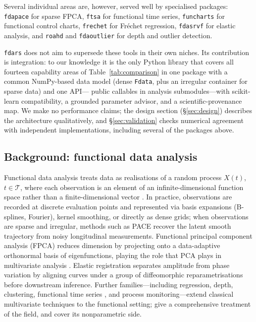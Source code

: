 Several individual areas are, however, served well by specialised packages:
\texttt{fdapace} \citep{r_fdapace} for sparse FPCA, \texttt{ftsa}
\citep{r_ftsa} for functional time series, \texttt{funcharts}
\citep{capezza_funcharts_2023} for functional control charts,
\texttt{frechet} \citep{r_frechet} for Fr\'{e}chet regression,
\texttt{fdasrvf} \citep{r_fdasrvf} for elastic analysis, and \texttt{roahd}
and \texttt{fdaoutlier} \citep{r_roahd,r_fdaoutlier} for depth and outlier
detection.

\texttt{fdars} does not aim to supersede these tools in their own niches.
Its contribution is integration: to our knowledge it is the only Python
library that covers all fourteen capability areas of
Table~\ref{tab:comparison} in one package with a common NumPy-based data
model (dense \texttt{Fdata}, plus an irregular container for sparse data) and
one API---\npubliccallables{} public callables in \nsubmodules{} analysis
submodules---with scikit-learn
compatibility, a grounded parameter advisor, and a scientific-provenance map.
We make no performance claims; the design section (\S\ref{sec:design})
describes the architecture qualitatively, and \S\ref{sec:validation} checks
numerical agreement with independent implementations, including several of
the packages above.

\subsection*{Background: functional data analysis}

Functional data analysis treats data as realisations of a random process
$X(t)$, $t \in \mathcal{T}$, where each observation is an element of an
infinite-dimensional function space rather than a finite-dimensional vector
\citep{ramsay_silverman_2005,ramsay_dalzell_1991}.
In practice, observations are recorded at discrete evaluation points and
represented via basis expansions (B-splines, Fourier), kernel smoothing, or
directly as dense grids; when observations are sparse and irregular, methods
such as PACE \citep{yao_muller_wang_2005} recover the latent smooth trajectory
from noisy longitudinal measurements.
Functional principal component analysis (FPCA) reduces dimension by projecting
onto a data-adaptive orthonormal basis of eigenfunctions, playing the role that
PCA plays in multivariate analysis \citep{ramsay_silverman_2005}.
Elastic registration \citep{srivastava_klassen_2016,marron_ramsay_sangalli_srivastava_2015}
separates amplitude from phase variation by aligning curves under a group
of diffeomorphic reparametrisations before downstream inference.
Further families---including regression, depth, clustering, functional time
series \citep{hormann_kokoszka_2010,hyndman_ullah_2007}, and process
monitoring---extend classical multivariate techniques to the functional
setting; \citet{ramsay_silverman_2005} give a comprehensive treatment of the
field, and \citet{ferraty_vieu_2006} cover its nonparametric side.

